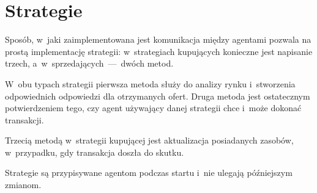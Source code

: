 \documentclass[12pt]{article}
\begin{document}
\section{Strategie}
Sposób, w~jaki zaimplementowana jest komunikacja między agentami pozwala na prostą implementację strategii: w~strategiach kupujących konieczne jest napisanie
trzech, a~w~sprzedających~---~dwóch metod.

W~obu typach strategii pierwsza metoda służy do analizy rynku i~stworzenia odpowiednich odpowiedzi dla otrzymanych ofert. Druga metoda jest ostatecznym potwierdzeniem
tego, czy agent używający danej strategii chce i~może dokonać transakcji.

Trzecią metodą w~strategii kupującej jest aktualizacja posiadanych zasobów, w~przypadku, gdy transakcja doszła do skutku.

Strategie są przypisywane agentom podczas startu i~nie ulegają późniejszym zmianom.
\end{document}
